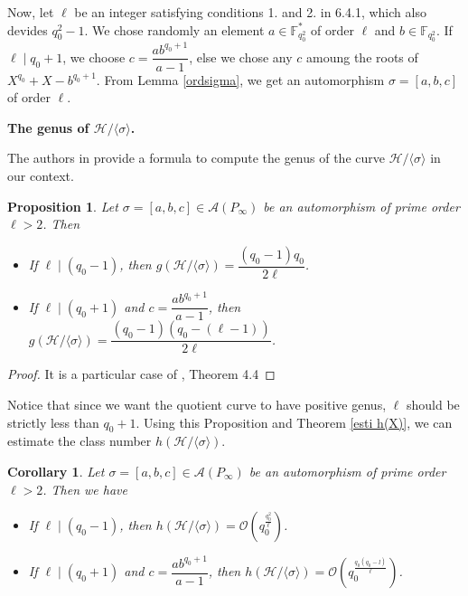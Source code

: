 \documentclass[10pt]{article}
\newtheorem{prop1}[thm]{Proposition}
\newtheorem{coro1}[thm]{Corollary}
\newcommand{\s}{\vspace{0.3cm}}
\newcommand{\calA}{\mathcal{A}}
\newcommand{\calH}{\mathcal{H}}
\newcommand{\calO}{\mathcal{O}}
\begin{document}
Now, let $\ell$ be an integer satisfying conditions 1. and 2. in 6.4.1, which also devides $q_0^2-1$. We chose randomly an element $a \in \mathbb{F}_{q_0^2}^*$ of order $\ell$ and $b \in \mathbb{F}_{q_0^2}$. If $\ell \mid q_0+1$, we choose $c=\dfrac{ab^{q_0+1}}{a-1}$, else we chose any $c$ amoung the roots of $X^{q_0}+X-b^{q_0+1}$. From Lemma \ref{ordsigma}, we get an automorphism $\sigma = [a,b,c]$ of order $\ell$.

\s

\bf{The genus of $\calH/\langle \sigma \rangle$}. \rm 

\s

The authors in \cite{Gar} provide a formula to compute the genus of the curve $\calH/\langle \sigma \rangle$ in our context.

\s

\begin{prop1} \label{genus}
Let $\sigma = [a,b,c] \in \calA(P_{\infty})$ be an automorphism of prime order $\ell > 2$. Then 
\begin{itemize}
\item[(i)] If $\ell \mid (q_0-1)$, then $g(\calH/\langle \sigma \rangle) = \dfrac{(q_0-1)q_0}{2\ell}$.
\item[(ii)] If $\ell \mid (q_0+1)$ and $c = \dfrac{ab^{q_0+1}}{a-1}$, then $g(\calH/\langle \sigma \rangle) = \dfrac{(q_0-1)(q_0-(\ell-1))}{2\ell}$.
\end{itemize}
\end{prop1}

\s

\begin{proof}
It is a particular case of \cite{Gar}, Theorem 4.4
\end{proof}

Notice that since we want the quotient curve to have positive genus, $\ell$ should be strictly less than $q_0+1$. Using this Proposition and Theorem \ref{esti h(X)}, we can estimate the class number $h(\calH/\langle \sigma \rangle)$.

\s

\begin{coro1} \label{lastcorollary}
Let $\sigma = [a,b,c] \in \calA(P_{\infty})$ be an automorphism of prime order $\ell > 2$. Then we have 
\begin{itemize}
\item[(i)] If $\ell \mid (q_0-1)$, then $h(\calH/\langle \sigma \rangle) = \calO \left(q_0^{\frac{q_0^2}{\ell}}\right)$.
\item[(ii)] If $\ell \mid (q_0+1)$ and $c=\dfrac{ab^{q_0+1}}{a-1}$, then $h(\calH/\langle \sigma \rangle) = \calO \left(q_0^{\frac{q_0(q_0-l)}{\ell}}\right)$.
\end{itemize}
\end{coro1}
\end{document}
